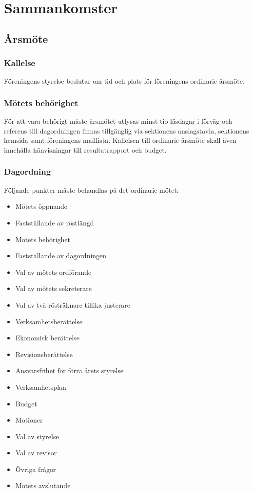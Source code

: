 \section{Sammankomster}

\subsection{Årsmöte}

\subsubsection{Kallelse}
Föreningens styrelse beslutar om tid och plats för föreningens ordinarie årsmöte.

\subsubsection{Mötets behörighet} \label{sec:mötets-behörighet}
För att vara behörigt måste årsmötet utlysas minst tio läsdagar i förväg och referens till dagordningen finnas tillgänglig via sektionens anslagstavla, sektionens hemsida samt föreningens maillista. Kallelsen till ordinarie årsmöte skall även innehålla hänvisningar till resultatrapport och budget.

\subsubsection{Dagordning}
Följande punkter måste behandlas på det ordinarie mötet:
\begin{itemize}
    \item Mötets öppnande
    \item Fastställande av röstlängd
    \item Mötets behörighet
    \item Fastställande av dagordningen
    \item Val av mötets ordförande
    \item Val av mötets sekreterare
    \item Val av två rösträknare tillika justerare
    \item Verksamhetsberättelse
    \item Ekonomisk berättelse
    \item Revisionsberättelse
    \item Ansvarsfrihet för förra årets styrelse
    \item Verksamhetsplan
    \item Budget
    \item Motioner
    \item Val av styrelse
    \item Val av revisor
    \item Övriga frågor
    \item Mötets avslutande
\end{itemize}

